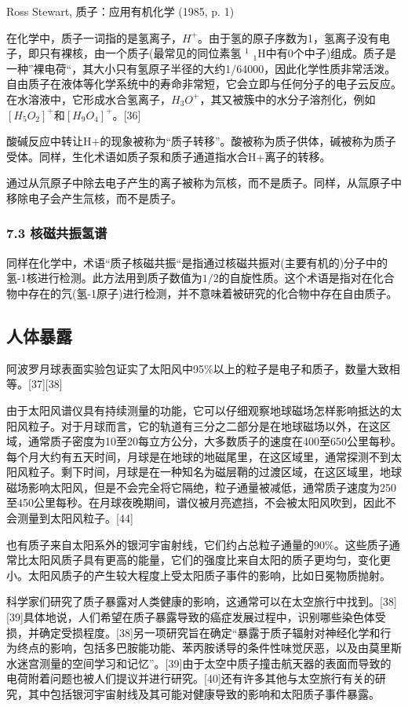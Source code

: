 Ross Stewart, 质子：应用有机化学 (1985, p. 1)

在化学中，质子一词指的是氢离子，$H^+$。由于氢的原子序数为1，氢离子没有电子，即只有裸核，由一个质子(最常见的同位素氢 $^1$ $_1\text{H}$中有0个中子)组成。质子是一种”裸电荷“，其大小只有氢原子半径的大约1/64000，因此化学性质非常活泼。自由质子在液体等化学系统中的寿命非常短，它会立即与任何分子的电子云反应。在水溶液中，它形成水合氢离子，$H_3O^+$，其又被簇中的水分子溶剂化，例如$[H_5O_2]^+\text{和}[H_9O_4]^+$。[36]

酸碱反应中转让H+的现象被称为“质子转移”。酸被称为质子供体，碱被称为质子受体。同样，生化术语如质子泵和质子通道指水合H+离子的转移。

通过从氘原子中除去电子产生的离子被称为氘核，而不是质子。同样，从氚原子中移除电子会产生氚核，而不是质子。

\subsubsection{7.3 核磁共振氢谱}
同样在化学中，术语“质子核磁共振“是指通过核磁共振对(主要有机的)分子中的氢-1核进行检测。此方法用到质子数值为$1/2$的自旋性质。这个术语是指对在化合物中存在的氕(氢-1原子)进行检测，并不意味着被研究的化合物中存在自由质子。

\subsection{人体暴露}
阿波罗月球表面实验包证实了太阳风中95\%以上的粒子是电子和质子，数量大致相等。[37][38]

由于太阳风谱仪具有持续测量的功能，它可以仔细观察地球磁场怎样影响抵达的太阳风粒子。对于月球而言，它的轨道有三分之二部分是在地球磁场以外，在这区域，通常质子密度为10至20每立方公分，大多数质子的速度在400至650公里每秒。每个月大约有五天时间，月球是在地球的地磁尾里，在这区域里，通常探测不到太阳风粒子。剩下时间，月球是在一种知名为磁层鞘的过渡区域，在这区域里，地球磁场影响太阳风，但是不会完全将它隔绝，粒子通量被减低，通常质子速度为250至450公里每秒。在月球夜晚期间，谱仪被月亮遮挡，不会被太阳风吹到，因此不会测量到太阳风粒子。[44]

也有质子来自太阳系外的银河宇宙射线，它们约占总粒子通量的90\%。这些质子通常比太阳风质子具有更高的能量，它们的强度比来自太阳的质子更均匀，变化更小。太阳风质子的产生较大程度上受太阳质子事件的影响，比如日冕物质抛射。

科学家们研究了质子暴露对人类健康的影响，这通常可以在太空旅行中找到。[38][39]具体地说，人们希望在质子暴露导致的癌症发展过程中，识别哪些染色体受损，并确定受损程度。[38]另一项研究旨在确定“暴露于质子辐射对神经化学和行为终点的影响，包括多巴胺能功能、苯丙胺诱导的条件性味觉厌恶，以及由莫里斯水迷宫测量的空间学习和记忆”。[39]由于太空中质子撞击航天器的表面而导致的电荷附着问题也被人们提议并进行研究。[40]还有许多其他与太空旅行有关的研究，其中包括银河宇宙射线及其可能对健康导致的影响和太阳质子事件暴露。


